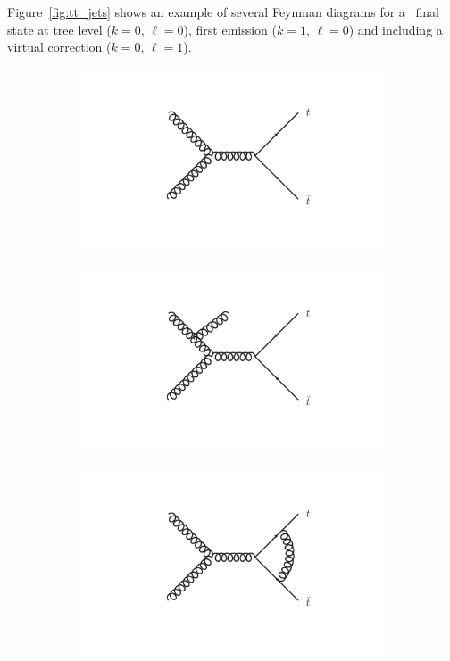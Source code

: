 Figure~\ref{fig:tt_jets} shows an example of several Feynman diagrams for a \ttbar\ final state at tree level ($k=0$, $\ell=0$), first emission ($k=1$, $\ell=0$) and including a virtual correction ($k=0$, $\ell=1$).
\begin{figure}[t!]
  \centering
  \begin{subfigure}{0.32\textwidth}
  \includegraphics[width=\textwidth]{MCsimulation/Figures/tt_0jet}
  \caption{}\end{subfigure}
  \begin{subfigure}{0.32\textwidth}
  \includegraphics[width=\textwidth]{MCsimulation/Figures/tt_1jet}
  \caption{}\end{subfigure}
  \begin{subfigure}{0.32\textwidth}
  \includegraphics[width=\textwidth]{MCsimulation/Figures/tt_1loop}

\end{subfigure}
\end{figure}
